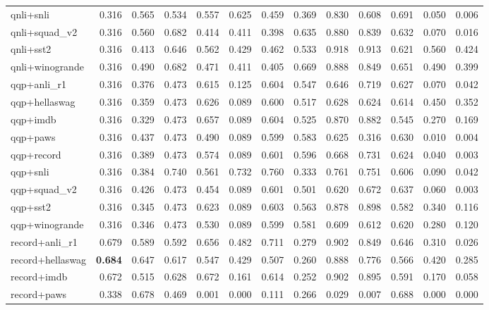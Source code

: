 \begin{table}[t]
\begin{tabular}{lrrrrrrrrrrrr}
    qnli+snli & 0.316 & 0.565 & 0.534 & 0.557 & 0.625 & 0.459 & 0.369 & 0.830 & 0.608 & 0.691 & 0.050 & 0.006 \\
    qnli+squad\_v2 & 0.316 & 0.560 & 0.682 & 0.414 & 0.411 & 0.398 & 0.635 & 0.880 & 0.839 & 0.632 & 0.070 & 0.016 \\
    qnli+sst2 & 0.316 & 0.413 & 0.646 & 0.562 & 0.429 & 0.462 & 0.533 & 0.918 & 0.913 & 0.621 & 0.560 & 0.424 \\
    qnli+winogrande & 0.316 & 0.490 & 0.682 & 0.471 & 0.411 & 0.405 & 0.669 & 0.888 & 0.849 & 0.651 & 0.490 & 0.399 \\
    qqp+anli\_r1 & 0.316 & 0.376 & 0.473 & 0.615 & 0.125 & 0.604 & 0.547 & 0.646 & 0.719 & 0.627 & 0.070 & 0.042 \\
    qqp+hellaswag & 0.316 & 0.359 & 0.473 & 0.626 & 0.089 & 0.600 & 0.517 & 0.628 & 0.624 & 0.614 & 0.450 & 0.352 \\
    qqp+imdb & 0.316 & 0.329 & 0.473 & 0.657 & 0.089 & 0.604 & 0.525 & 0.870 & 0.882 & 0.545 & 0.270 & 0.169 \\
    qqp+paws & 0.316 & 0.437 & 0.473 & 0.490 & 0.089 & 0.599 & 0.583 & 0.625 & 0.316 & 0.630 & 0.010 & 0.004 \\
    qqp+record & 0.316 & 0.389 & 0.473 & 0.574 & 0.089 & 0.601 & 0.596 & 0.668 & 0.731 & 0.624 & 0.040 & 0.003 \\
    qqp+snli & 0.316 & 0.384 & 0.740 & 0.561 & 0.732 & 0.760 & 0.333 & 0.761 & 0.751 & 0.606 & 0.090 & 0.042 \\
    qqp+squad\_v2 & 0.316 & 0.426 & 0.473 & 0.454 & 0.089 & 0.601 & 0.501 & 0.620 & 0.672 & 0.637 & 0.060 & 0.003 \\
    qqp+sst2 & 0.316 & 0.345 & 0.473 & 0.623 & 0.089 & 0.603 & 0.563 & 0.878 & 0.898 & 0.582 & 0.340 & 0.116 \\
    qqp+winogrande & 0.316 & 0.346 & 0.473 & 0.530 & 0.089 & 0.599 & 0.581 & 0.609 & 0.612 & 0.620 & 0.280 & 0.120 \\
    record+anli\_r1 & 0.679 & 0.589 & 0.592 & 0.656 & 0.482 & 0.711 & 0.279 & 0.902 & 0.849 & 0.646 & 0.310 & 0.026 \\
    record+hellaswag & \textbf{0.684} & 0.647 & 0.617 & 0.547 & 0.429 & 0.507 & 0.260 & 0.888 & 0.776 & 0.566 & 0.420 & 0.285 \\
    record+imdb & 0.672 & 0.515 & 0.628 & 0.672 & 0.161 & 0.614 & 0.252 & 0.902 & 0.895 & 0.591 & 0.170 & 0.058 \\
    record+paws & 0.338 & 0.678 & 0.469 & 0.001 & 0.000 & 0.111 & 0.266 & 0.029 & 0.007 & 0.688 & 0.000 & 0.000 \\

\end{tabular}
\end{table}
